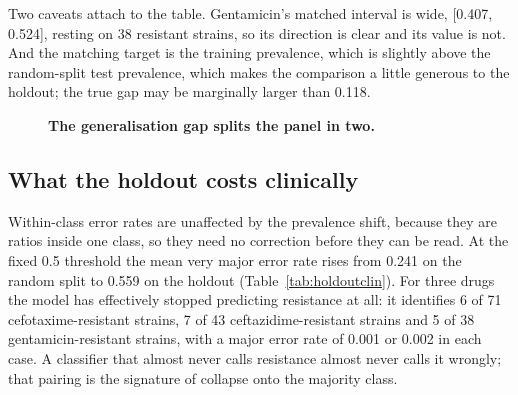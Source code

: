 Two caveats attach to the table. Gentamicin's matched interval is wide, [0.407, 0.524], resting on
38 resistant strains, so its direction is clear and its value is not. And the matching target is the
training prevalence, which is slightly above the random-split test prevalence, which makes the
comparison a little generous to the holdout; the true gap may be marginally larger than 0.118.

\begin{figure}[t]\centering
{}
\caption{\textbf{The generalisation gap splits the panel in two.} }\label{fig:twogroups}
\end{figure}

\subsection*{What the holdout costs clinically}

Within-class error rates are unaffected by the prevalence shift, because they are ratios inside one
class, so they need no correction before they can be read. At the fixed 0.5 threshold the mean very
major error rate rises from 0.241 on the random split to 0.559 on the holdout
(Table~\ref{tab:holdoutclin}). For three drugs the model has effectively stopped predicting
resistance at all: it identifies 6 of 71 cefotaxime-resistant strains, 7 of 43
ceftazidime-resistant strains and 5 of 38 gentamicin-resistant strains, with a major error rate of
0.001 or 0.002 in each case. A classifier that almost never calls resistance almost never calls it
wrongly; that pairing is the signature of collapse onto the majority class.

